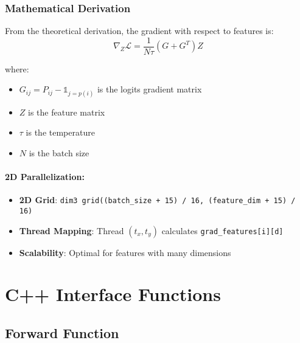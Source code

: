 \documentclass[a4paper,11pt]{article}
\begin{document}
\subsubsection{Mathematical Derivation}

From the theoretical derivation, the gradient with respect to features is:
\begin{equation}
\nabla_Z \mathcal{L} = \frac{1}{N \tau} (G + G^T) Z
\end{equation}

where:
\begin{itemize}
    \item $G_{ij} = P_{ij} - \mathbb{1}_{j=p(i)}$ is the logits gradient matrix
    \item $Z$ is the feature matrix
    \item $\tau$ is the temperature
    \item $N$ is the batch size
\end{itemize}

\paragraph{2D Parallelization:}
\begin{itemize}
    \item \textbf{2D Grid}: \texttt{dim3 grid((batch\_size + 15) / 16, (feature\_dim + 15) / 16)}
    \item \textbf{Thread Mapping}: Thread \((t_x, t_y)\) calculates \texttt{grad\_features[i][d]}
    \item \textbf{Scalability}: Optimal for features with many dimensions
\end{itemize}

\section{C++ Interface Functions}

\subsection{Forward Function}
\end{document}
